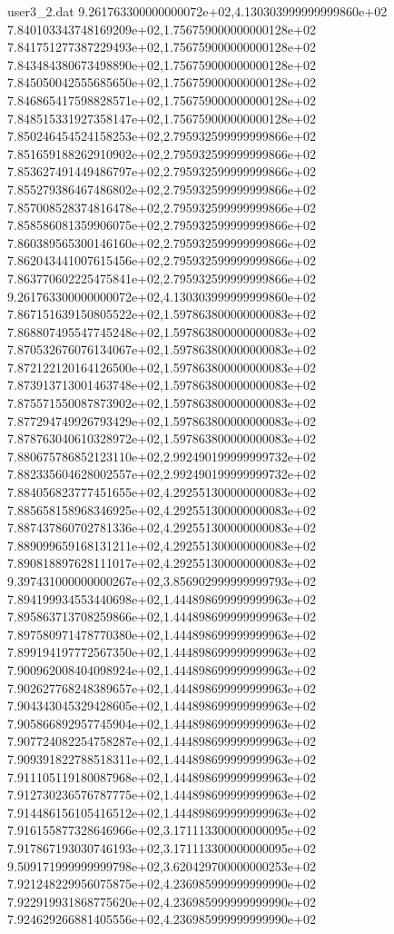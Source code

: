 \begin{filecontents}{user3_2.dat}
9.261763300000000072e+02,4.130303999999999860e+02
7.840103343748169209e+02,1.756759000000000128e+02
7.841751277387229493e+02,1.756759000000000128e+02
7.843484380673498890e+02,1.756759000000000128e+02
7.845050042555685650e+02,1.756759000000000128e+02
7.846865417598828571e+02,1.756759000000000128e+02
7.848515331927358147e+02,1.756759000000000128e+02
7.850246454524158253e+02,2.795932599999999866e+02
7.851659188262910902e+02,2.795932599999999866e+02
7.853627491449486797e+02,2.795932599999999866e+02
7.855279386467486802e+02,2.795932599999999866e+02
7.857008528374816478e+02,2.795932599999999866e+02
7.858586081359906075e+02,2.795932599999999866e+02
7.860389565300146160e+02,2.795932599999999866e+02
7.862043441007615456e+02,2.795932599999999866e+02
7.863770602225475841e+02,2.795932599999999866e+02
9.261763300000000072e+02,4.130303999999999860e+02
7.867151639150805522e+02,1.597863800000000083e+02
7.868807495547745248e+02,1.597863800000000083e+02
7.870532676076134067e+02,1.597863800000000083e+02
7.872122120164126500e+02,1.597863800000000083e+02
7.873913713001463748e+02,1.597863800000000083e+02
7.875571550087873902e+02,1.597863800000000083e+02
7.877294749926793429e+02,1.597863800000000083e+02
7.878763040610328972e+02,1.597863800000000083e+02
7.880675786852123110e+02,2.992490199999999732e+02
7.882335604628002557e+02,2.992490199999999732e+02
7.884056823777451655e+02,4.292551300000000083e+02
7.885658158968346925e+02,4.292551300000000083e+02
7.887437860702781336e+02,4.292551300000000083e+02
7.889099659168131211e+02,4.292551300000000083e+02
7.890818897628111017e+02,4.292551300000000083e+02
9.397431000000000267e+02,3.856902999999999793e+02
7.894199934553440698e+02,1.444898699999999963e+02
7.895863713708259866e+02,1.444898699999999963e+02
7.897580971478770380e+02,1.444898699999999963e+02
7.899194197772567350e+02,1.444898699999999963e+02
7.900962008404098924e+02,1.444898699999999963e+02
7.902627768248389657e+02,1.444898699999999963e+02
7.904343045329428605e+02,1.444898699999999963e+02
7.905866892957745904e+02,1.444898699999999963e+02
7.907724082254758287e+02,1.444898699999999963e+02
7.909391822788518311e+02,1.444898699999999963e+02
7.911105119180087968e+02,1.444898699999999963e+02
7.912730236576787775e+02,1.444898699999999963e+02
7.914486156105416512e+02,1.444898699999999963e+02
7.916155877328646966e+02,3.171113300000000095e+02
7.917867193030746193e+02,3.171113300000000095e+02
9.509171999999999798e+02,3.620429700000000253e+02
7.921248229956075875e+02,4.236985999999999990e+02
7.922919931868775620e+02,4.236985999999999990e+02
7.924629266881405556e+02,4.236985999999999990e+02

\end{filecontents}
